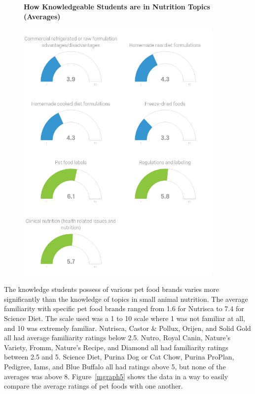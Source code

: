     \begin{figure}[htbp] 
    \centering
    \textbf{How Knowledgeable Students are in Nutrition Topics (Averages)}\par\medskip
    \includegraphics[width=0.9\textwidth]{Images/nks2.png}
    \label{mgraph12}
    \end{figure}
\par The knowledge students possess of various pet food brands varies more significantly than the knowledge of topics in small animal nutrition. The average familiarity with specific pet food brands ranged from 1.6 for Nutrisca to 7.4 for Science Diet. The scale used was a 1 to 10 scale where 1 was not familiar at all, and 10 was extremely familiar. Nutrisca, Castor \& Pollux, Orijen, and Solid Gold all had average familiarity ratings below 2.5. Nutro, Royal Canin, Nature's Variety, Fromm, Nature's Recipe, and Diamond all had familiarity ratings between 2.5 and 5. Science Diet, Purina Dog or Cat Chow, Purina ProPlan, Pedigree, Iams, and Blue Buffalo all had ratings above 5, but none of the averages was above 8. Figure~\ref{mgraph5} shows the data in a way to easily compare the average ratings of pet foods with one another.

